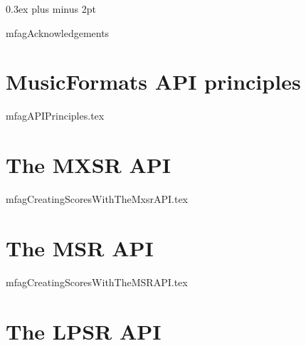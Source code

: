 \documentclass[11pt,a4paper]{report}
\begin{document}
{ %
  \setlength {\parskip} {0.3ex plus \baselineskip minus 2pt}

  \tableofcontents

  \listoffigures
}



\newpage

{mfagAcknowledgements}


\part{MusicFormats API principles}

{mfagAPIPrinciples.tex}


\part{The MXSR API}

\useRegularPagesHeadersAndFooters


{mfagCreatingScoresWithTheMxsrAPI.tex}


\part{The MSR API}

{mfagCreatingScoresWithTheMSRAPI.tex}


\part{The LPSR API}
\end{document}
